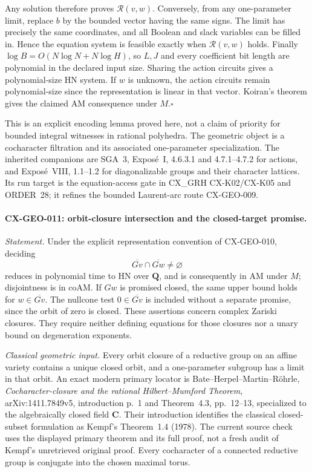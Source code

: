 \documentclass[11pt,a4paper]{article}
\begin{document}
Any solution therefore proves $\mathcal R(v,w)$. Conversely, from any
one-parameter limit, replace $b$ by the bounded vector having the same
signs. The limit has precisely the same coordinates, and all Boolean
and slack variables can be filled in. Hence the equation system is
feasible exactly when $\mathcal R(v,w)$ holds.
Finally $\log B=O(N\log N+N\log H)$, so $L,J$ and every coefficient
bit length are polynomial in the declared input size. Sharing the action
circuits gives a polynomial-size HN system. If $w$ is unknown, the action
circuits remain polynomial-size since the representation is linear in
that vector. Koiran's theorem gives the claimed AM consequence under
$M$.\hfill$\square$

This is an explicit encoding lemma proved here, not a claim of priority
for bounded integral witnesses in rational polyhedra. The geometric
object is a cocharacter filtration and its associated one-parameter
specialization. The inherited companions are SGA~3, Expos\'e~I,
4.6.3.1 and 4.7.1--4.7.2 for actions, and Expos\'e~VIII, 1.1--1.2 for
diagonalizable groups and their character lattices. Its run target is
the equation-access gate in CX\_GRH CX-K02/CX-K05 and ORDER~28; it
refines the bounded Laurent-arc route CX-GEO-009.

\paragraph{CX-GEO-011: orbit-closure intersection and the closed-target promise.}
\emph{Statement.} Under the explicit representation convention of
CX-GEO-010, deciding
\[
             \overline{Gv}\cap\overline{Gw}\ne\varnothing
\]
reduces in polynomial time to HN over $\mathbf Q$, and is consequently
in AM under $M$; disjointness is in coAM. If $Gw$ is promised closed,
the same upper bound holds for $w\in\overline{Gv}$. The nullcone test
$0\in\overline{Gv}$ is included without a separate promise, since the
orbit of zero is closed. These assertions concern complex Zariski
closures. They require neither defining equations for those closures nor
a unary bound on degeneration exponents.

\emph{Classical geometric input.} Every orbit closure of a reductive
group on an affine variety contains a unique closed orbit, and a
one-parameter subgroup has a limit in that orbit. An exact modern primary
locator is Bate--Herpel--Martin--R\"ohrle,
\emph{Cocharacter-closure and the rational Hilbert--Mumford Theorem},
arXiv:1411.7849v5, introduction p.~1 and Theorem~4.3, pp.~12--13,
specialized to the algebraically closed field $\mathbf C$.
Their introduction identifies the classical closed-subset formulation
as Kempf's Theorem~1.4 (1978). The current source check uses the displayed
primary theorem and its full proof, not a fresh audit of Kempf's
unretrieved original proof. Every cocharacter of a connected reductive
group is conjugate into the chosen maximal torus.
\end{document}
